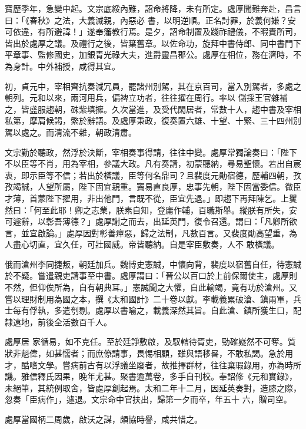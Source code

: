 \begin{pinyinscope}
 寶歷季年，急變中起。文宗底綏內難，詔命將降，未有所定。處厚聞難奔赴，昌言曰：「《春秋》之法，大義滅親，內惡必
 書，以明逆順。正名討罪，於義何嫌？安可依違，有所避諱！」遂奉籓教行焉。是夕，詔命制置及踐祚禮儀，不暇責所司，皆出於處厚之議。及禮行之後，皆葉舊章。以佐命功，旋拜中書侍郎、同中書門下平章事、監修國史，加銀青光祿大夫，進爵靈昌郡公。處厚在相位，務在濟時，不為身計。中外補授，咸得其宜。



 初，貞元中，宰相齊抗奏減冗員，罷諸州別駕，其在京百司，當入別駕者，多處之朝列。元和以來，兩河用兵，偏裨立功者，往往擢在周行。率以
 儲採王官雜補之，皆盛服趨朝，硃紫填擁。久次當進，及受代閑居者，常數十人，趨中書及宰相私第，摩肩候謁，繁於辭語。及處厚秉政，復奏置六雄、十望、十緊、三十四州別駕以處之。而清流不雜，朝政清肅。



 文宗勤於聽政，然浮於決斷，宰相奏事得請，往往中變。處厚常獨論奏曰：「陛下不以臣等不肖，用為宰相，參議大政。凡有奏請，初蒙聽納，尋易聖懷。若出自宸衷，即示臣等不信；若出於橫議，臣等何名鼎司？且裴度元勛宿德，歷輔四朝，孜
 孜竭誠，人望所屬，陛下固宜親重。竇易直良厚，忠事先朝，陛下固當委信。微臣才薄，首蒙陛下擢用，非出他門，言既不從，臣宜先退。」即趨下再拜陳乞。上矍然曰：「何至此耶！卿之志業，朕素自知，登庸作輔，百職斯舉。縱朕有所失，安可遽辭，以彰吾薄德？」處厚謝之而去，出延英門，復令召還。謂曰：「凡卿所欲言，並宜啟論。」處厚因對彰善癉惡，歸之法制，凡數百言。又裴度勛高望重，為人盡心切直，宜久任，可壯國威。帝皆聽納。自是宰臣敷奏，人不
 敢橫議。



 俄而滄州李同捷叛，朝廷加兵。魏博史憲誠，中懷向背，裴度以宿舊自任，待憲誠於不疑。嘗遣親吏請事至中書。處厚謂曰：「晉公以百口於上前保爾使主，處厚則不然，但仰俟所為，自有朝典耳。」憲誠聞之大懼，自此輸竭，竟有功於滄州。又嘗以理財制用為國之本，撰《太和國計》二十卷以獻。李載義累破滄、鎮兩軍，兵士每有俘執，多遣刳剔。處厚以書喻之，載義深然其旨。自此滄、鎮所獲生口，配隸遠地，前後全活數百千人。



 處厚居
 家循易，如不克任。至於廷諍敷啟，及馭轄待胥吏，勁確嶷然不可奪。質狀非魁偉，如甚懦者；而庶僚請事，畏惕相顧，雖與語移晷，不敢私謁。急於用才，酷嗜文學。嘗病前古有以浮議坐廢者，故推擇群材，往往棄瑕錄用，亦為時所譏。雅信釋氏因果，晚年尤甚。聚書逾萬卷，多手自刊校。奉詔修《元和實錄》，未絕筆，其統例取舍，皆處厚創起焉。太和二年十二月，因延英奏對，造膝之際，忽奏「臣病作」，遽退。文宗命中官扶出，歸第一夕而卒，年五十
 六，贈司空。



 處厚當國柄二周歲，啟沃之謀，頗協時譽，咸共惜之。




\end{pinyinscope}
